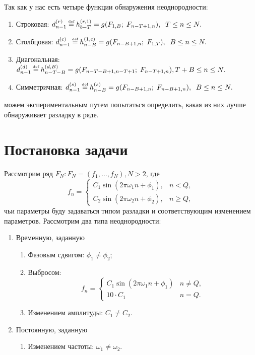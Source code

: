 \documentclass[specialist, substylefile = spbu.rtx,
			   subf, href, 12pt]{disser}
\newcommand\eqdef{\mathrel{\stackrel{\makebox[0pt]{\mbox{\normalfont\tiny def}}}{=}}}
\begin{document}
Так как у нас есть четыре функции обнаружения неоднородности:
\begin{enumerate}
	\item 
	Строковая: $d_{n-1}^{(r)} \eqdef h_{b-T}^{(r, 1)} = g(F_{1, B};\; F_{n-T+1, n}), \;\; T \leq n \leq N.$
	
	\item
	Столбцовая: $d_{n-1}^{(c)} \eqdef h_{n-B}^{(1, c)} = g(F_{n-B+1, n};\; F_{1, T}), \;\; B \leq n \leq N.$
	
	\item
	Диагональная: $d_{n-1}^{(d)} \eqdef h_{n-T-B}^{(d, B)} = g(F_{n-T-B+1, n-T+1};\; F_{n-T+1, n}), T + B \leq n \leq N.$
	
	\item
	Симметричная: $d_{n-1}^{(s)} \eqdef h_{n-B}^{(s)} = g(F_{n-B+1, n};\; F_{n-B+1, n}), \;\; B \leq n \leq N.$
	
\end{enumerate}
можем экспериментальным путем попытаться определить, какая из них лучше обнаруживает разладку в ряде.

\section{Постановка задачи}
Рассмотрим ряд $ F_N: F_N = (f_1, \dotsc, f_{N}), N > 2 $, где
\begin{equation}\label{eq:f_n_ch3}
	f_n = 
	\begin{cases}
		C_1\sin(2\pi\omega_1n + \phi_1), & n < Q, \\
		C_2\sin(2\pi\omega_2n + \phi_2), & n \geq Q,
	\end{cases}
\end{equation}
чьи параметры буду задаваться типом разладки и соответствующим изменением параметров.
Рассмотрим два типа неоднородности:
\begin{enumerate}
	\item
	Временную, заданную
	\begin{enumerate}
		\item 
		Фазовым сдвигом: $\phi_1 \neq \phi_2$;
		\item 
		Выбросом:
		$$f_n = 
		\begin{cases}
			C_1\sin(2\pi\omega_1n + \phi_1) & n \neq Q, \\
			10\cdot C_1 & n = Q.
		\end{cases}$$
		\item 
		Изменением амплитуды: $C_1 \neq C_2$.
	\end{enumerate}
	
	\item
	Постоянную, заданную
	\begin{enumerate}
		\item 
		Изменением частоты: $\omega_1 \neq \omega_2$.
	\end{enumerate}
	
\end{enumerate}
\end{document}
